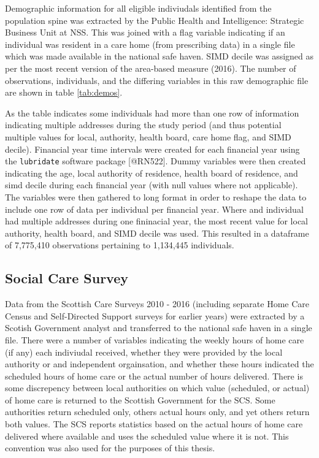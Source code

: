 \documentclass[]{article}
\begin{document}
Demographic information for all eligible indiviudals identified from the
population spine was extracted by the Public Health and Intelligence:
Strategic Business Unit at NSS. This was joined with a flag variable
indicating if an individual was resident in a care home (from
prescribing data) in a single file which was made available in the
national safe haven. SIMD decile was assigned as per the most recent
version of the area-based measure (2016). The number of observations,
individuals, and the differing variables in this raw demographic file
are shown in table \ref{tab:demos}.

As the table indicates some individuals had more than one row of
information indicating multiple addresses during the study period (and
thus potential multiple values for local, authority, health board, care
home flag, and SIMD decile). Financial year time intervals were created
for each financial year using the \texttt{lubridate} software package
{[}@RN522{]}. Dummy variables were then created indicating the age,
local authority of residence, health board of residence, and simd decile
during each financial year (with null values where not applicable). The
variables were then gathered to long format in order to reshape the data
to include one row of data per individual per financial year. Where and
individual had multiple addresses during one fininacial year, the most
recent value for local authority, health board, and SIMD decile was
used. This resulted in a dataframe of 7,775,410 observations pertaining
to 1,134,445 individuals.

\FloatBarrier

\subsection{Social Care Survey}\label{subsubsec:scs-summs}

Data from the Scottish Care Surveys 2010 - 2016 (including separate Home
Care Census and Self-Directed Support surveys for earlier years) were
extracted by a Scotish Government analyst and transferred to the
national safe haven in a single file. There were a number of variables
indicating the weekly hours of home care (if any) each indiviudal
received, whether they were provided by the local authority or and
independent orgainsation, and whether these hours indicated the
scheduled hours of home care or the actual number of hours delivered.
There is some discrepency between local authorities on which value
(scheduled, or actual) of home care is returned to the Scottish
Government for the SCS. Some authorities return scheduled only, others
actual hours only, and yet others return both values. The SCS reports
statistics based on the actual hours of home care delivered where
available and uses the scheduled value where it is not. This convention
was also used for the purposes of this thesis.
\end{document}
